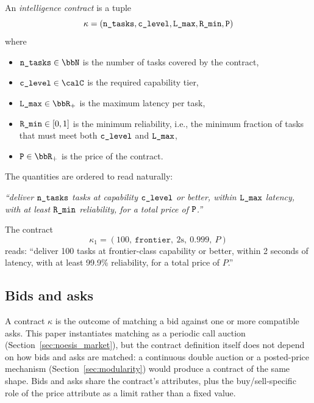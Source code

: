 \begin{definition}
\label{def:contract}
An \emph{intelligence contract} is a tuple
$$
  \kappa = ( \textnormal{\texttt{n\_tasks}}, \textnormal{\texttt{c\_level}}, \textnormal{\texttt{L\_max}}, \textnormal{\texttt{R\_min}}, \textnormal{\texttt{P}} )
$$
where
\begin{itemize}
  \item $\ntasksattr \in \bbN$ is the number of tasks covered by the
    contract,
  \item $\clevelattr \in \calC$ is the required capability tier,
  \item $\lmaxattr \in \bbR_+$ is the maximum latency per task,
  \item $\textnormal{\texttt{R\_min}} \in [0, 1]$ is the minimum reliability, i.e., the
    minimum fraction of tasks that must meet both $\textnormal{\texttt{c\_level}}$ and
    $\textnormal{\texttt{L\_max}}$,
  \item $\priceattr \in \bbR_+$ is the price of the contract.
\end{itemize}
\end{definition}

The quantities are ordered to read naturally: 

\emph{``deliver $\textnormal{\texttt{n\_tasks}}$ tasks at capability $\textnormal{\texttt{c\_level}}$ or better,
within $\textnormal{\texttt{L\_max}}$ latency, with at least $\textnormal{\texttt{R\_min}}$ reliability, for a total
price of $\textnormal{\texttt{P}}$.''}

\begin{example}
\label{ex:contract}
The contract
$$
  \kappa_1 = (100,\ \texttt{frontier},\ 2\text{s},\ 0.999,\ P)
$$
reads: ``deliver 100 tasks at frontier-class capability or better,
within 2 seconds of latency, with at least 99.9\% reliability, for a total
price of $P$.''
\end{example}

\subsection{Bids and asks}
\label{sec:bids_asks}

A contract $\kappa$ is the outcome of \NoesisMarket{} matching a bid
against one or more compatible asks. This paper instantiates matching as
a periodic call auction (Section~\ref{sec:noesis_market}), but the
contract definition itself does not depend on how bids and asks are
matched: a continuous double auction or a posted-price mechanism
(Section~\ref{sec:modularity}) would produce a contract of the same
shape. Bids and asks share the contract's attributes, plus the
buy/sell-specific role of the price attribute as a limit rather than a
fixed value.


